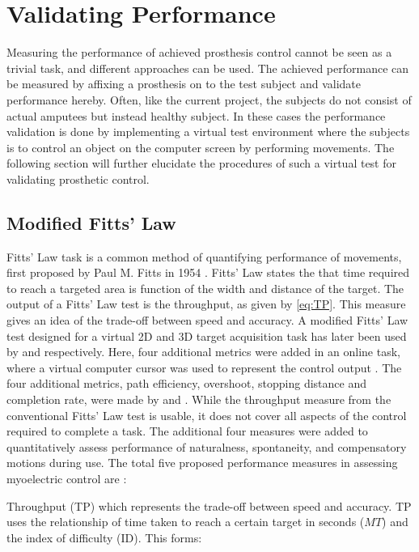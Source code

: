 
\section{Validating Performance} \label{sec:BG:validatingPerformance}

Measuring the performance of achieved prosthesis control cannot be seen as a trivial task, and different approaches can be used. The achieved performance can be measured by affixing a prosthesis on to the test subject and validate performance hereby. Often, like the current project, the subjects do not consist of actual amputees but instead healthy subject. In these cases the performance validation is done by implementing a virtual test environment where the subjects is to control an object on the computer screen by performing movements. The following section will further elucidate the procedures of such a virtual test for validating prosthetic control.      


\subsection{Modified Fitts' Law} \label{sub:BG:fitts}

Fitts' Law task is a common method of quantifying performance of movements, first proposed by Paul M. Fitts in 1954 \cite{Fitts1954}. Fitts' Law states the that time required to reach a targeted area is function of the width and distance of the target. The output of a Fitts' Law test is the throughput, as given by \eqref{eq:TP}. This measure gives an idea of the trade-off between speed and accuracy. A modified Fitts' Law test designed for a virtual 2D and 3D target acquisition task has later been used by \cite{Kamavuako2014} and \cite{Scheme2013} respectively. Here, four additional metrics were added in an online task, where a virtual computer cursor was used to represent the control output \cite{Scheme2013, Kamavuako2014}. The four additional metrics, path efficiency, overshoot, stopping distance and completion rate, were made by \cite{Poulton2013} and \cite{Simon2011}. While the throughput measure from the conventional Fitts' Law test is usable, it does not cover all aspects of the control required to complete a task. The additional four measures were added to quantitatively assess performance of naturalness, spontaneity, and compensatory motions during use. The total five proposed performance measures in assessing myoelectric control are \cite{Scheme2013a}: 

Throughput (TP) which represents the trade-off between speed and accuracy. TP uses the relationship of time taken to reach a certain target in seconds ($MT$) and the index of difficulty (ID). This forms: \cite{Scheme2013,Fitts1954}

